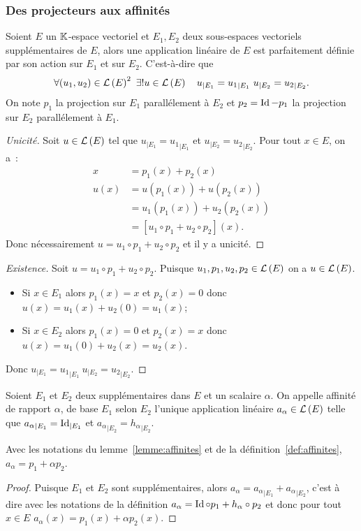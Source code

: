 \subsubsection{Des projecteurs aux affinités}
\begin{lemme}\label{lemme:affinites}
  Soient $E$ un $\mathbb{K}$-espace vectoriel et $E_1,E_2$ deux sous-espaces vectoriels supplémentaires de $E$, alors une application linéaire de $E$ est parfaitement définie par son action sur $E_1$ et sur $E_2$. C'est-à-dire que
  \begin{equation}
    \forall (u_1,u_2) \in \Endo{E}^2 \ \exists! u \in \Endo{E} \quad u_{|E_1}={u_1}_{|E_1} \ u_{|E_2}={u_2}_{|E_2}.
  \end{equation}
  On note $p_1$ la projection sur $E_1$ parallélement à $E_2$ et $p_2=\operatorname{Id}-p_1$ la projection sur $E_2$ parallélement à $E_1$.
\end{lemme}
\begin{proof}[Unicité]
  Soit $u \in \mathcal{L}\left(E\right)$ tel que $u_{|E_1}={u_1}_{|E_1}$ et  $u_{|E_2}={u_2}_{|E_2}$. Pour tout $x \in E$, on a~:
  \begin{align}
    x&=p_1(x)+p_2(x)\\
    u(x)&=u(p_1(x))+u(p_2(x))\\
    &=u_1(p_1(x)) +u_2(p_2(x))\\
    &=[u_1\circ p_1 +u_2 \circ p_2](x).
  \end{align}
  Donc nécessairement $u=u_1\circ p_1 +u_2 \circ p_2$ et il y a unicité.
\end{proof}
\begin{proof}[Existence]
  Soit $u=u_1\circ p_1 +u_2 \circ p_2$. Puisque $u_1,p_1,u_2,p_2 \in \mathcal{L}\left(E\right)$ on a $u \in \mathcal{L}\left(E\right)$.
  \begin{itemize}
  \item Si $x \in E_1$ alors $p_1(x)=x$ et $p_2(x)=0$ donc $u(x)=u_1(x)+u_2(0)=u_1(x)$;
  \item Si $x \in E_2$ alors $p_1(x)=0$ et $p_2(x)=x$ donc $u(x)=u_1(0)+u_2(x)=u_2(x)$.
  \end{itemize}
  Donc $u_{|E_1}={u_1}_{|E_1} \ u_{|E_2}={u_2}_{|E_2}$.
\end{proof}
%
\begin{defdef}\label{def:affinites}
  Soient $E_1$ et $E_2$ deux supplémentaires dans $E$ et un scalaire $\alpha$. On appelle affinité de rapport $\alpha$, de base $E_1$ selon $E_2$ l'unique application linéaire $a_\alpha \in \mathcal{L}\left(E\right)$ telle que ${a_\alpha}_{|E_1} = \operatorname{Id}_{|E_1}$ et ${a_\alpha}_{|E_2} = {h_\alpha}_{|E_2}$.
\end{defdef}
%
\begin{prop}
  Avec les notations du lemme~\ref{lemme:affinites} et de la définition~\ref{def:affinites}, $a_{\alpha}=p_1+\alpha p_2$.
\end{prop}
\begin{proof}
  Puisque $E_1$ et $E_2$ sont supplémentaires, alors $a_\alpha= {a_\alpha}_{|E_1} + {a_\alpha}_{|E_2}$, c'est à dire avec les notations de la définition $a_\alpha= \operatorname{Id} \circ p_1 + h_\alpha \circ p_2$ et donc pour tout $x \in E$ $a_\alpha(x)=p_1(x)+\alpha p_2(x)$.
\end{proof}

